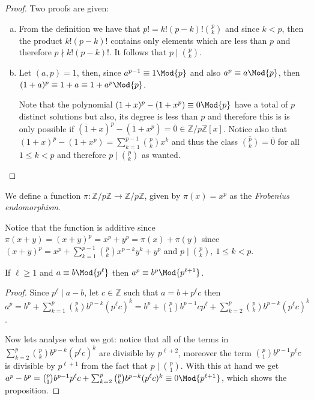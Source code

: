 \begin{proof}
    Two proofs are given:
    \begin{enumerate}[(a)]
        \item From the definition we have that \(p! = k!(p-k)!\binom{p}{k}\) and
              since \(k < p\), then the  product \(k! (p-k)!\) contains only elements
              which are less than \(p\) and therefore \(p \nmid k! (p-k)!\). It
              follows that \(p \mid \binom{p}{k}\).
        \item Let \((a, p) = 1\), then, since \(a^{p-1} \equiv 1 \Mod{p}\) and
              also  \(a^p \equiv a \Mod{p}\), then  \((1+a)^{p} \equiv 1+a \equiv 1 +
              a^p \Mod{p}\).

              Note that the polynomial \((1+x)^p - (1+x^p) \equiv 0 \Mod{p}\) have a
              total of \(p\) distinct solutions but also, its degree is less than
              \(p\) and therefore this is is only possible if \((\overline{1}+x)^p -
              (\overline{1}+x^p) = \overline{0} \in \mathbb{Z}/p\mathbb{Z}[x]\).
              Notice also that \((1+x)^p - (1+x^p) = \sum_{k=1}^{p-1}
              \binom{p}{k}x^k\) and thus the class \(\overline{\binom{p}{k}} =
              \overline{0}\) for all \(1 \leqslant k < p\) and therefore \(p \mid
              \binom{p}{k}\) as wanted.
    \end{enumerate}
\end{proof}

\begin{definition}
    We define a function \(\pi : \mathbb{Z}/p\mathbb{Z} \to
    \mathbb{Z}/p\mathbb{Z}\), given by \(\pi(x) = x^p\) as the \emph{Frobenius
        endomorphism}.

    Notice that the function is additive since  \(\pi(x + y) = (x+y)^p = x^p +
    y^p = \pi(x) + \pi(y)\) since \((x + y)^p = x^p + \sum_{k=1}^{p-1}
    \binom{p}{k} x^{p-k}y^{k} + y^p\) and  \(p \mid \binom{p}{k},\ 1
    \leqslant k < p\).
\end{definition}

\begin{lemma}
    If \(\ell \geqslant  1\)  and \(a \equiv b \Mod{p^\ell}\) then \(a^p \equiv
    b^p \Mod{p^{\ell+1}}\).
\end{lemma}

\begin{proof}
    Since \(p^\ell \mid a - b\), let \(c \in \mathbb{Z}\) such that \(a = b +
    p^\ell c\) then \(a^p = b^p + \sum_{k=1}^{p} \binom{p}{k} b^{p-k}(p^\ell
    c)^k = b^p + \binom{p}{1} b^{p-1} cp^\ell + \sum_{k=2}^{p} \binom{p}{k}
    b^{p-k} (p^\ell c)^{k}\).

    Now lets analyse what we got: notice that all of the terms in \(\sum_{k=2}^p
    \binom{p}{k} b^{p-k} (p^{\ell} c)^k\) are divisible by \(p^{\ell+2}\),
    moreover the term \(\binom{p}{1} b^{p-1} p^\ell c\) is divisible by
    \(p^{\ell+1}\) from the fact that \(p \mid \binom{p}{1}\). With this at hand
    we get \(a^p - b^p = \binom{p}{1} b^{p-1} p^\ell c + \sum_{k=2}^p
    \binom{p}{k} b^{p-k} (p^\ell c)^k \equiv 0 \Mod{p^{\ell+1}}\), which shows
    the proposition.
\end{proof}

